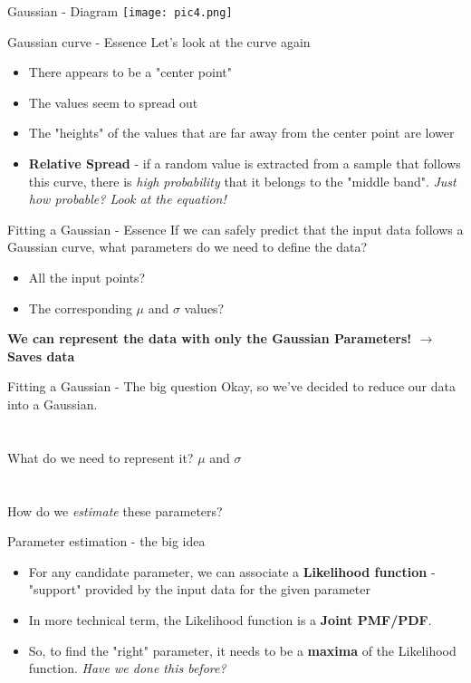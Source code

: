 \documentclass{beamer}
\begin{document}
\begin{frame}{Gaussian - Diagram}
\texttt{[image: pic4.png]}
\end{frame}

\begin{frame}{Gaussian curve - Essence}
    Let's look at the curve again
    \begin{itemize}
        \item There appears to be a "center point" 
        \item The values seem to spread out 
        \item The "heights" of the values that are far away from the center point are lower
        \item \textbf{Relative Spread} - if a random value is extracted from a sample that follows this curve, there is \textit{high probability} that it belongs to the "middle band". \textit{Just how probable? Look at the equation!}
    \end{itemize}
\end{frame}

\begin{frame}{Fitting a Gaussian - Essence}
    If we can safely predict that the input data follows a Gaussian curve, what parameters do we need to define the data?
    \begin{itemize}
        \item All the input points? 
        \item The corresponding $\mu$ and $\sigma$ values?
    \end{itemize}
    
    \textbf{We can represent the data with only the Gaussian Parameters! $\rightarrow$ Saves data}
\end{frame}

\begin{frame}{Fitting a Gaussian - The big question}
    Okay, so we've decided to reduce our data into a Gaussian. \\ \\ \\
    What do we need to represent it? $\mu$ and $\sigma$ \\ \\ \\
    How do we \textit{estimate} these parameters?
\end{frame}

\begin{frame}{Parameter estimation - the big idea}
    \begin{itemize}
        \item For any candidate parameter, we can associate a \textbf{Likelihood function} - "support" provided by the input data for the given parameter
        \item In more technical term, the Likelihood function is a \textbf{Joint PMF/PDF}.
        \item So, to find the "right" parameter, it needs to be a \textbf{maxima} of the Likelihood function. \textit{Have we done this before?}
    \end{itemize}
\end{frame}
\end{document}

